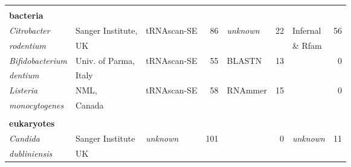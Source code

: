 \begin{footnotesize}
\begin{table}
\begin{center}
\begin{tabular}{|ll|lr|lr|lr|}
\multicolumn{8}{l}{} \\
\multicolumn{8}{l}{\textbf{bacteria}} \\ \hline
\emph{Citrobacter}                       & Sanger Institute, & tRNAscan-SE   & 86       & \emph{unknown} & 22 & Infernal       & 56       \\
\emph{rodentium}                         & UK                &               &          &                &    & \& Rfam        &          \\ \hline
\emph{Bifidobacterium}                   & Univ. of Parma,   & tRNAscan-SE   & 55       & BLASTN         & 13 &                &  0       \\
\emph{dentium}                           & Italy             &               &          &                &    &                &          \\ \hline
\emph{Listeria}                          & NML,              & tRNAscan-SE   & 58       & RNAmmer        & 15 &                & 0        \\
\emph{monocytogenes}                     & Canada            &               &          &                &    &                &          \\ \hline
\multicolumn{8}{l}{} \\
\multicolumn{8}{l}{\textbf{eukaryotes}} \\ \hline
\emph{Candida}                           & Sanger Institute  &\emph{unknown} &     101  &                & 0  & \emph{unknown} & 11       \\
\emph{dubliniensis}                      & UK                &               &          &                &    &                &          \\ \hline

\end{tabular}
\end{center}
\end{table}
\end{footnotesize}
